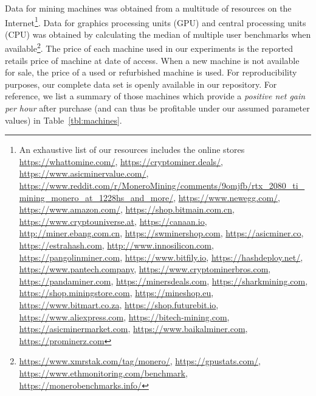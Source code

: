 Data for mining machines was obtained from a multitude of resources on the
Internet\footnote{An exhaustive list of our resources includes the online
stores \url{https://whattomine.com/}, \url{https://cryptominer.deals/},
\url{https://www.asicminervalue.com/},
 \url{https://www.reddit.com/r/MoneroMining/comments/9omjfb/rtx_2080_ti_mining_monero_at_1228hs_and_more/},
\url{https://www.newegg.com/}, \url{https://www.amazon.com/},
\url{https://shop.bitmain.com.cn}, \url{https://www.cryptouniverse.at},
\url{https://canaan.io}, \url{http://miner.ebang.com.cn},
\url{https://swminershop.com}, \url{https://asicminer.co},
\url{https://estrahash.com}, \url{http://www.innosilicon.com},
\url{https://pangolinminer.com}, \url{https://www.bitfily.io},
\url{https://hashdeploy.net/}, \url{https://www.pantech.company},
\url{https://www.cryptominerbros.com}, \url{https://pandaminer.com},
\url{https://minersdeals.com}, \url{https://sharkmining.com},
\url{https://shop.miningstore.com}, \url{https://mineshop.eu},
\url{https://www.bitmart.co.za}, \url{https://shop.futurebit.io},
\url{https://www.aliexpress.com}, \url{https://bitech-mining.com},
\url{https://asicminermarket.com}, \url{https://www.baikalminer.com},
\url{https://prominerz.com}}. Data for graphics processing units (GPU) and
central processing units (CPU) was obtained by calculating the median of
multiple user benchmarks when available\footnote{\url{https://www.xmrstak.com/tag/monero/}, \url{https://gpustats.com/},
\url{https://www.ethmonitoring.com/benchmark},
\url{https://monerobenchmarks.info/}}. The price of each machine used in our experiments is the
reported retails price of machine at date of access. When a new machine is not available
for sale, the price of a used or refurbished machine is used. For reproducibility
purposes, our complete data set is openly available in our repository. For
reference, we list a summary of those machines which provide a
\emph{positive net gain per hour} after purchase (and can thus be profitable
under our assumed parameter values) in Table~\ref{tbl:machines}.

